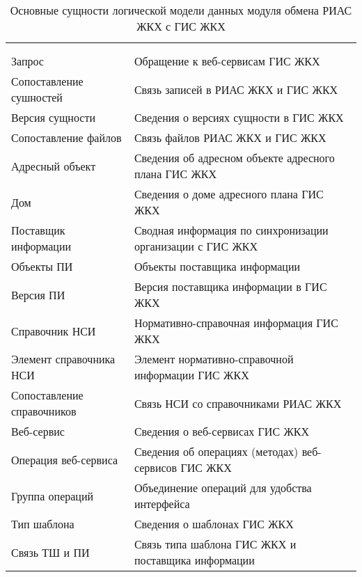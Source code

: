 \begin{myTable}
\begin{longtable}[h]{|p{}|p{}|}
	\caption{\label{tab:software-gis-entities}Основные сущности логической модели данных модуля обмена РИАС ЖКХ с ГИС ЖКХ} \\
	\hline
		\thead{Название сущности} &
		\thead{Описание} \\
	\hline
		\theadnum{1} & \theadnum{2} \\
	\hline \endfirsthead
	\hline
		\theadnum{1} & \theadnum{2} \\
	\hline \endhead
		Запрос & Обращение к веб-сервисам ГИС ЖКХ \\ \hline
		Сопоставление сушностей & Связь записей в РИАС ЖКХ и ГИС ЖКХ \\ \hline
		Версия сущности & Сведения о версиях сущности в ГИС ЖКХ \\ \hline
		Сопоставление файлов & Связь файлов РИАС ЖКХ и ГИС ЖКХ \\ \hline
		Адресный объект & Сведения об адресном объекте адресного плана ГИС ЖКХ \\ \hline
		Дом & Сведения о доме адресного плана ГИС ЖКХ \\ \hline
		Поставщик информации & Сводная информация по синхронизации организации с ГИС ЖКХ \\ \hline
		Объекты ПИ & Объекты поставщика информации \\ \hline
		Версия ПИ & Версия поставщика информации в ГИС ЖКХ \\ \hline
		Справочник НСИ & Нормативно-справочная информация ГИС ЖКХ \\ \hline
		Элемент справочника НСИ & Элемент нормативно-справочной информации ГИС ЖКХ \\ \hline
		Сопоставление справочников & Связь НСИ со справочниками РИАС ЖКХ \\ \hline
		Веб-сервис & Сведения о веб-сервисах ГИС ЖКХ \\ \hline
		Операция веб-сервиса & Сведения об операциях (методах) веб-сервисов ГИС ЖКХ \\ \hline
		Группа операций & Объединение операций для удобства интерфейса \\ \hline
		Тип шаблона & Сведения о шаблонах ГИС ЖКХ \\ \hline
		Связь ТШ и ПИ & Связь типа шаблона ГИС ЖКХ и поставщика информации \\ \hline
\end{longtable}
\end{myTable}

